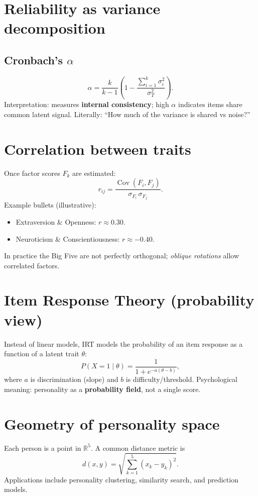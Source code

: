 \documentclass[11pt]{article}
\begin{document}
\section{Reliability as variance decomposition}
\subsection*{Cronbach's $\alpha$}
\begin{equation}
\alpha = \frac{k}{k-1}\left(1 - \frac{\sum\limits_{i=1}^k \sigma_i^2}{\sigma_T^2}\right).
\end{equation}
Interpretation: measures \textbf{internal consistency}; high $\alpha$ indicates items share common latent signal. Literally: ``How much of the variance is shared vs noise?''

\section{Correlation between traits}
Once factor scores $F_k$ are estimated:
\begin{equation}
 r_{ij} = \frac{\operatorname{Cov}(F_i,F_j)}{\sigma_{F_i}\,\sigma_{F_j}}.
\end{equation}
Example bullets (illustrative):
\begin{itemize}
  \item Extraversion \& Openness: $r \approx 0.30$.
  \item Neuroticism \& Conscientiousness: $r \approx -0.40$.
\end{itemize}
In practice the Big Five are not perfectly orthogonal; \emph{oblique rotations} allow correlated factors.

\section{Item Response Theory (probability view)}
Instead of linear models, IRT models the probability of an item response as a function of a latent trait $\theta$:
\begin{equation}
 P(X=1\mid \theta) = \frac{1}{1 + e^{-a(\theta-b)}},
\end{equation}
where $a$ is discrimination (slope) and $b$ is difficulty/threshold. Psychological meaning: personality as a \textbf{probability field}, not a single score.

\section{Geometry of personality space}
Each person is a point in $\mathbb{R}^5$. A common distance metric is
\begin{equation}
 d(x,y) = \sqrt{\sum_{k=1}^{5} (x_k - y_k)^2}.
\end{equation}
Applications include personality clustering, similarity search, and prediction models.
\end{document}

